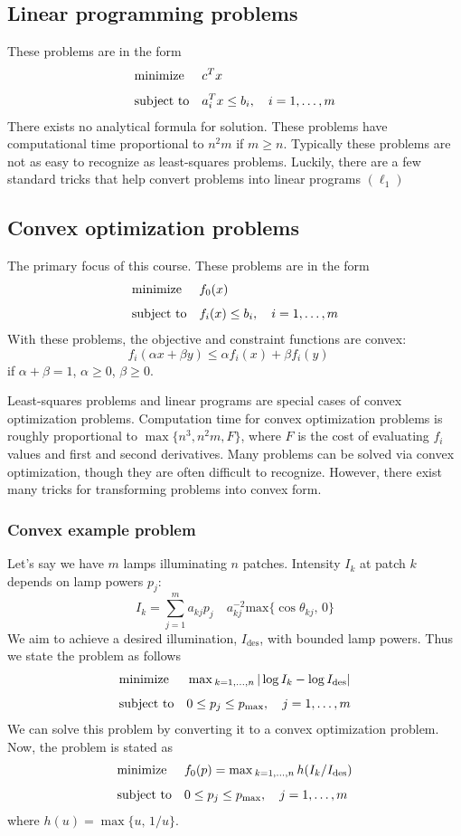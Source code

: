 \subsection{Linear programming problems}
These problems are in the form
\[
    \begin{aligned} & \underset{}{\operatorname{minimize}} & & c^T x \\ & \text{subject to} & & \begin{aligned}[t] a_i^T x \leq b_i, \quad i=1,\dots,m \end{aligned} \end{aligned}
\] 
There exists no analytical formula for solution. These problems have computational time proportional to 
$n^2 m$ if $m \geq n$. Typically these problems are not as easy to recognize as least-squares problems. 
Luckily, there are a few standard tricks that help convert problems into linear programs $(\ell_{1})$


\subsection{Convex optimization problems}
The primary focus of this course. These problems are in the form
\[
    \begin{aligned} & \underset{}{\operatorname{minimize}} & & f_0(x) \\ & \text{subject to} & & \begin{aligned}[t] f_i(x) \leq b_i, \quad i=1,\dots,m \end{aligned} \end{aligned}
\] 
With these problems, the objective and constraint functions are convex:
\[
    f_i(\alpha x + \beta y) \leq \alpha f_i(x) + \beta f_i(y) \quad
\] 
if $\alpha + \beta = 1$, $\alpha \geq 0$, $\beta \geq 0$. 

Least-squares problems and linear programs are special cases of convex optimization 
problems. Computation time for convex optimization problems is roughly proportional to $\max\{n^3, n^2 m, F\}$, where $F$ is the cost of 
evaluating $f_i$ values and first and second derivatives. Many problems can be solved via convex optimization, though they are often difficult 
to recognize. However, there exist many tricks for transforming problems into convex form.


\subsubsection{Convex example problem} 
Let's say we have $m$ lamps illuminating $n$ patches. Intensity $I_k$ at patch $k$ depends on lamp powers $p_j$:
\[
    I_k = \sum_{j=1}^m a_{kj} p_j \quad a_{kj}^{-2} \text{max} \{\cos \theta_{kj}, \, 0\}
\]
We aim to achieve a desired illumination, $I_\text{des}$, with bounded lamp powers. Thus we state the problem as follows
\[ %
    \opt{minimize}{}{\max {}_{k=1, \dots, n} \, |\log I_k - \log I_\text{des}|}{0 \leq p_j \leq p_\text{max}, \quad j=1, \dots, m}
\]
We can solve this problem by converting it to a convex optimization problem. Now, the problem is stated as
\[
    \begin{aligned} & \underset{}{\operatorname{minimize}} & & f_0(p) = \max {}_{k=1, \dots, n} \, h(I_k / I_\text{des}) \\ & \text{subject to} & & \begin{aligned}[t] 0 \leq p_j \leq p_\text{max}, \quad j=1, \dots, m \end{aligned} \end{aligned}
\]
where $h(u) = \max\{u, \, 1/u\}$.

